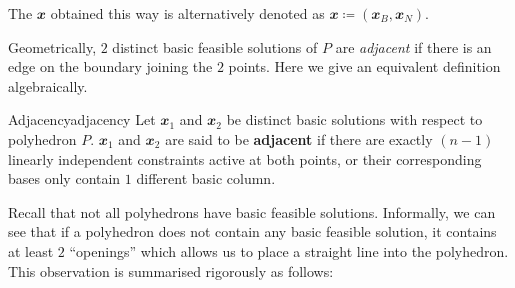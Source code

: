 \documentclass[math, code]{amznotes}
\theoremstyle{remark}
\begin{document}
The $\mathbfit{x}$ obtained this way is alternatively denoted as $\mathbfit{x} \coloneqq (\mathbfit{x}_B, \mathbfit{x}_N)$.

Geometrically, $2$ distinct basic feasible solutions of $P$ are \textit{adjacent} if there is an edge on the boundary joining the $2$ points. Here we give an equivalent definition algebraically.
\begin{dfnbox}{Adjacency}{adjacency}
    Let $\mathbfit{x}_1$ and $\mathbfit{x}_2$ be distinct basic solutions with respect to polyhedron $P$. $\mathbfit{x}_1$ and $\mathbfit{x}_2$ are said to be {\color{red} \textbf{adjacent}} if there are exactly $(n - 1)$ linearly independent constraints active at both points, or their corresponding bases only contain $1$ different basic column.
\end{dfnbox}
Recall that not all polyhedrons have basic feasible solutions. Informally, we can see that if a polyhedron does not contain any basic feasible solution, it contains at least $2$ ``openings'' which allows us to place a straight line into the polyhedron. This observation is summarised rigorously as follows:
\end{document}
